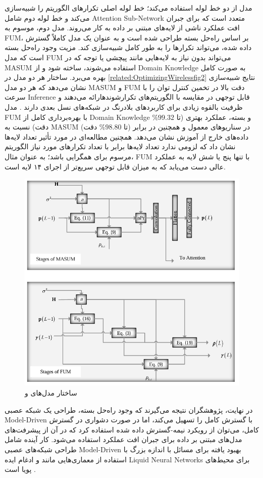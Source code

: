 مدل از دو خط لوله استفاده می‌کند؛ خط لوله اصلی تکرارهای الگوریتم را شبیه‌سازی می‌کند و خط لوله دوم شامل 
\gls{Attention Sub-Network}
متعدد است که برای جبران افت عملکرد ناشی از لایه‌های مبتنی بر داده به کار می‌روند.
مدل دوم، موسوم به 
\gls{FUM}،
بر اساس راه‌حل بسته طراحی شده است و به عنوان یک مدل کاملاً گسترش داده شده، می‌تواند تکرارها را به طور کامل شبیه‌سازی کند. مزیت وجود راه‌حل بسته است که مدل 
\gls{FUM}
می‌تواند بدون نیاز به لایه‌هایی مانند پیچشی  یا توجه که در 
\gls{MASUM}
استفاده می‌شوند، ساخته شود و از 
\gls{Domain Knowledge}
به صورت کامل بهره می‌برد. ساختار هر دو مدل در 
\autoref{related:OptimizingWirelessfig2}
نتایج شبیه‌سازی نشان می‌دهد که هر دو مدل 
\gls{MASUM}
و 
\gls{FUM}
دقت بالا در تخمین کنترل توان را با سرعت 
\gls{Inference}
قابل توجهی در مقایسه با الگوریتم‌های تکرارشوندهارائه می‌دهند و ظرفیت بالقوه زیادی برای کاربردهای بلادرنگ در شبکه‌های نسل بعدی دارند . مدل 
\gls{FUM}
با بهره‌برداری کامل از 
\gls{Domain Knowledge}
و بسته، عملکرد بهتری (تا 
$\%99.32$
دقت) نسبت به 
\gls{MASUM}
(تا 
$\%98.80$
دقت) در سناریوهای معمول و همچنین در برابر داده‌های خارج از آموزش نشان می‌دهد. همچنین مطالعه‌ای در مورد تأثیر تعداد لایه‌ها نشان داد که لزومی ندارد تعداد لایه‌ها برابر با تعداد تکرارهای مورد نیاز الگوریتم مرسوم برای همگرایی باشد؛ به عنوان مثال،
\gls{FUM}
با تنها پنج یا شش لایه به عملکرد عالی دست می‌یابد که به میزان قابل توجهی سریع‌تر از اجرای ۱۴ لایه است.
\begin{figure}
	\centering
	\includegraphics[width=0.7\linewidth]{./Pic/OptimizingWireless_related_fig2}
	\caption[ ساختار مدل‌های  و ]{ساختار مدل‌های  و  \cite{OptimizingWireless}}
	\label{related:OptimizingWirelessfig2}
\end{figure}
در نهایت، پژوهشگران نتیجه می‌گیرند که وجود راه‌حل بسته، طراحی یک شبکه عصبی 
\gls{Model-Driven}
با گسترش کامل را تسهیل می‌کند، اما در صورت دشواری در گسترش کامل، می‌توان از رویکرد نیمه-گسترش داده شده استفاده کرد که در آن از پیشرفت‌های مدل‌های مبتنی بر داده برای جبران افت عملکرد استفاده می‌شود. کار آینده شامل طراحی شبکه‌های عصبی 
\gls{Model-Driven}
بهبود یافته برای مسائل با اندازه بزرگ با استفاده از معماری‌هایی مانند
و ادغام ایده 
\gls{Liquid Neural Networks}
برای محیط‌های پویا است
\cite{OptimizingWireless}.


